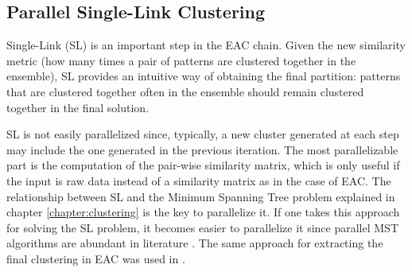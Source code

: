 \subsection{Parallel Single-Link Clustering}

Single-Link (SL) is an important step in the EAC chain.
Given the new similarity metric (how many times a pair of patterns are clustered together in the ensemble), SL provides an intuitive way of obtaining the final partition: patterns that are clustered together often in the ensemble should remain clustered together in the final solution.


SL is not easily parallelized since, typically, a new cluster generated at each step may include the one generated in the previous iteration.
The most parallelizable part is the computation of the pair-wise similarity matrix, which is only useful if the input is raw data instead of a similarity matrix as in the case of EAC.
The relationship between SL and the Minimum Spanning Tree problem explained in chapter \ref{chapter:clustering} is the key to parallelize it.
If one takes this approach for solving the SL problem, it becomes easier to parallelize it since parallel MST algorithms are abundant in literature \cite{Vineet2009,rostrup2013fast,Sousa2015}.
The same approach for extracting the final clustering in EAC was used in \cite{Fred2002}.


